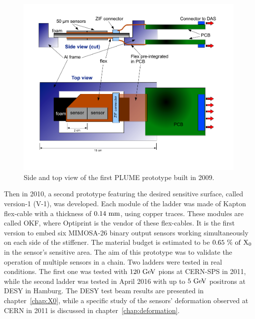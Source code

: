     \begin{figure}[!tbh]
      \centering
      \includegraphics[width = \textwidth]{Pictures/vxd/bos_ladder_v1_PLUME0.png}
      \caption{Side and top view of the first PLUME prototype built in 2009.}
    \end{figure}

    Then in 2010, a second prototype featuring the desired sensitive surface, called version-1 (V-1), was developed.
    Each module of the ladder was made of Kapton flex-cable with a thickness of $0.14~\rm{mm}$, using copper traces.
    These modules are called \gls{OKF}, where Optiprint is the vendor of these flex-cables.
    It is the first version to embed six \gls{MIMOSA}-26 binary output sensors working simultaneously on each side of the stiffener.
    The material budget is estimated to be $0.65~\% ~\rm{of}~\rm{X_0}$ in the sensor's sensitive area. 
    The aim of this prototype was to validate the operation of multiple sensors in a chain.
    Two ladders were tested in real conditions.
    The first one was tested with $120~\rm{GeV}$ pions at CERN-SPS in 2011, while the second ladder was tested in April 2016 with up to $5~\rm{GeV}$ positrons at DESY in Hamburg. 
    The DESY test beam results are presented in chapter~\ref{chap:X0}, while a specific study of the sensors' deformation observed at CERN in 2011 is discussed in chapter~\ref{chap:deformation}.

